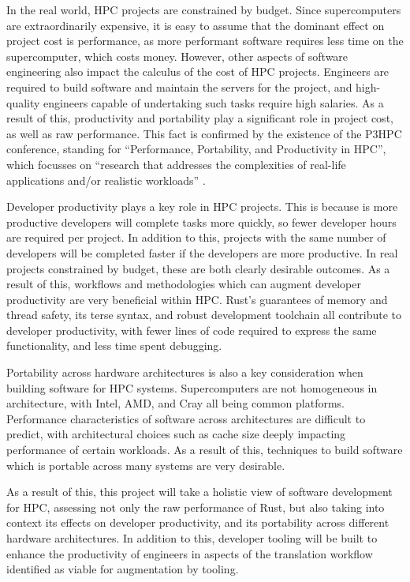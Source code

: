 In the real world, \acrshort{HPC} projects are constrained by budget. Since supercomputers are extraordinarily expensive, it is easy to assume that the dominant effect on project cost is performance, as more performant software requires less time on the supercomputer, which costs money. However, other aspects of software engineering also impact the calculus of the cost of \acrshort{HPC} projects. Engineers are required to build software and maintain the servers for the project, and high-quality engineers capable of undertaking such tasks require high salaries. As a result of this, productivity and portability play a significant role in project cost, as well as raw performance. This fact is confirmed by the existence of the P3HPC conference, standing for ``Performance, Portability, and Productivity in HPC'', which focusses on ``research that addresses the complexities of real-life applications and/or realistic workloads'' \cite{P3HPC}.

Developer productivity plays a key role in \acrshort{HPC} projects. This is because is more productive developers will complete tasks more quickly, so fewer developer hours are required per project. In addition to this, projects with the same number of developers will be completed faster if the developers are more productive. In real projects constrained by budget, these are both clearly desirable outcomes. As a result of this, workflows and methodologies which can augment developer productivity are very beneficial within \acrshort{HPC}. Rust's guarantees of memory and thread safety, its terse syntax, and robust development toolchain all contribute to developer productivity, with fewer lines of code required to express the same functionality, and less time spent debugging.

Portability across hardware architectures is also a key consideration when building software for \acrshort{HPC} systems. Supercomputers are not homogeneous in architecture, with Intel, AMD, and Cray all being common platforms. Performance characteristics of software across architectures are difficult to predict, with architectural choices such as cache size deeply impacting performance of certain workloads. As a result of this, techniques to build software which is portable across many systems are very desirable.

As a result of this, this project will take a holistic view of software development for \acrshort{HPC}, assessing not only the raw performance of Rust, but also taking into context its effects on developer productivity, and its portability across different hardware architectures. In addition to this, developer tooling will be built to enhance the productivity of engineers in aspects of the translation workflow identified as viable for augmentation by tooling.


